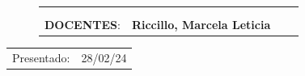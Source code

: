 \begin{titlepage}
\begin{figure}[H]
\begin{adjustwidth}{-1cm}{}
\begin{tabular}{llrr}
 &  & \\
 &  & \\
	\textbf{DOCENTES}:
	& \textbf{Riccillo, Marcela Leticia} & \\

\end{tabular}
\end{adjustwidth}
\end{figure}

\vspace*{0.5cm}
\vspace*{1.5cm}

\vspace{100pt}

\begin{tabular}{ll}

Presentado: & 28/02/24\\

\end{tabular}
\end{titlepage}
